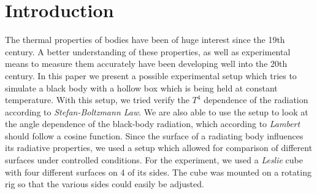\documentclass[a4paper,10pt,twocolumn]{article}
\begin{document}
    \section{Introduction}\label{sec:introdction}
    The thermal properties of bodies have been of huge interest since the 19th century.
    A better understanding of these properties, as well as experimental means to measure them accurately have been developing well into the 20th century.
    In this paper we present a possible experimental setup which tries to simulate a black body with a hollow box which is being held at constant temperature.
    With this setup, we tried verify the $T^4$ dependence of the radiation according to \textit{Stefan-Boltzmann Law}.
    We are also able to use the setup to look at the angle dependence of the black-body radiation, which according to \textit{Lambert} should follow a cosine function.
    Since the surface of a radiating body influences its radiative properties, we used a setup which allowed for comparison of different surfaces under controlled conditions.
    For the experiment, we used a \textit{Leslie} cube with four different surfaces on 4 of its sides.
    The cube was mounted on a rotating rig so that the various sides could easily be adjusted.
    
\end{document}
